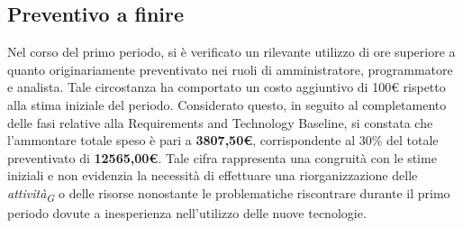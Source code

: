 \subsection{Preventivo a finire}
Nel corso del primo periodo, si è verificato un rilevante utilizzo di ore superiore a quanto originariamente preventivato nei ruoli di amministratore, programmatore e analista. Tale circostanza ha comportato un costo aggiuntivo di 100€ rispetto alla stima iniziale del periodo.
Considerato questo, in seguito al completamento delle fasi relative alla Requirements and Technology Baseline, si constata che l'ammontare totale speso è pari a \textbf{3807,50€}, corrispondente al 30\% del totale preventivato di \textbf{12565,00€}.
Tale cifra rappresenta una congruità con le stime iniziali e non evidenzia la necessità di effettuare una riorganizzazione delle \textit{attività}\textsubscript{\textit{G}} o delle risorse nonostante le problematiche riscontrare durante il primo periodo dovute a inesperienza nell'utilizzo delle nuove tecnologie.

